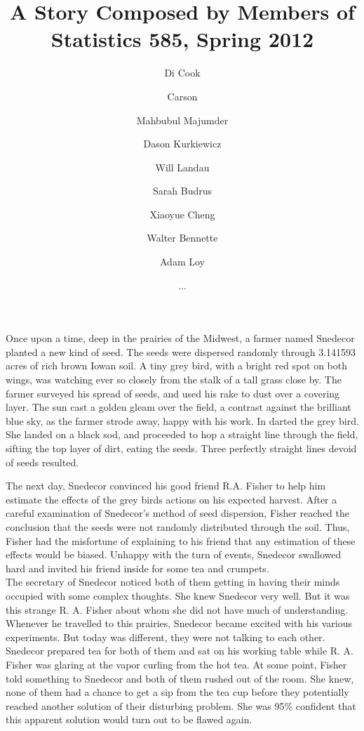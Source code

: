 \documentclass{article}
\begin{document}
\title{A Story Composed by Members of Statistics 585, Spring 2012}
\author{Di Cook \and Carson \and Mahbubul Majumder \and Dason Kurkiewicz \and Will Landau \and Sarah Budrus \and Xiaoyue Cheng \and Walter Bennette \and Adam Loy \and ...}
\maketitle

Once upon a time, deep in the prairies of the Midwest, a farmer named Snedecor planted a new kind of seed. The seeds were dispersed randomly through 3.141593 acres of rich brown Iowan soil. A tiny grey bird, with a bright red spot on both wings, was watching ever so closely from the stalk of a tall grass close by. The farmer surveyed his spread of seeds, and used his rake to dust over a covering layer. The sun cast a golden gleam over the field, a contrast against the brilliant blue sky, as the farmer strode away, happy with his work. In darted the grey bird. She landed on a black sod, and proceeded to hop a straight line through the field, sifting the top layer of dirt, eating the seeds. Three perfectly straight lines devoid of seeds resulted. 

The next day, Snedecor convinced his good friend R.A. Fisher to help him estimate the effects of the grey birds actions on his expected harvest. After a careful examination of Snedecor's method of seed dispersion, Fisher reached the conclusion that the seeds were not randomly distributed through the soil. Thus, Fisher had the misfortune of explaining to his friend that any estimation of these effects would be biased. Unhappy with the turn of events, Snedecor swallowed hard and invited his friend inside for some tea and crumpets. \\


The secretary of Snedecor noticed both of them getting in having their minds occupied with some complex thoughts. She knew Snedecor very well. But it was this strange R. A. Fisher about whom she did not have much of understanding. Whenever he travelled to this prairies, Snedecor became excited with his various experiments. But today was different, they were not talking to each other. Snedecor prepared tea for both of them and sat on his working table while R. A. Fisher was glaring at the vapor curling from the hot tea. At some point, Fisher told something to Snedecor and both of them rushed out of the room. She knew, none of them had a chance to get a sip from the tea cup before they potentially reached another solution of their disturbing problem. She was 95\% confident that this apparent solution would turn out to be flawed again. 
\end{document}
